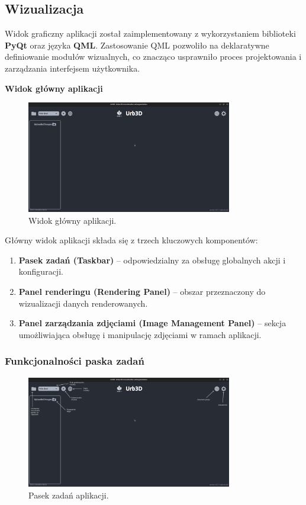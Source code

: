 \subsection{Wizualizacja}

Widok graficzny aplikacji został zaimplementowany z wykorzystaniem biblioteki \textbf{PyQt} oraz języka \textbf{QML}. Zastosowanie QML pozwoliło na deklaratywne definiowanie modułów wizualnych, co znacząco usprawniło proces projektowania i zarządzania interfejsem użytkownika.

\clearpage

\textbf{Widok główny aplikacji}
\begin{figure}[h!]
    \centering
    \includegraphics[width=0.8\textwidth]{img/wizualizacja/ui_glowny_widok.png}
    \caption{Widok główny aplikacji.}
\end{figure}

Główny widok aplikacji składa się z trzech kluczowych komponentów:
\begin{enumerate}
    \item \textbf{Pasek zadań (Taskbar)} -- odpowiedzialny za obsługę globalnych akcji i konfiguracji.
    \item \textbf{Panel renderingu (Rendering Panel)} -- obszar przeznaczony do wizualizacji danych renderowanych.
    \item \textbf{Panel zarządzania zdjęciami (Image Management Panel)} -- sekcja umożliwiająca obsługę i manipulację zdjęciami w ramach aplikacji.
\end{enumerate}

\subsubsection{Funkcjonalności paska zadań}
\begin{figure}[h!]
    \centering
    \includegraphics[width=0.8\textwidth]{img/wizualizacja/ui_opis_funk.png}
    \caption{Pasek zadań aplikacji.}
\end{figure}


